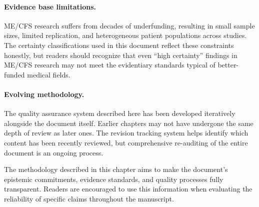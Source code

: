\paragraph{Evidence base limitations.}
ME/CFS research suffers from decades of underfunding, resulting in small sample sizes, limited replication, and heterogeneous patient populations across studies. The certainty classifications used in this document reflect these constraints honestly, but readers should recognize that even ``high certainty'' findings in ME/CFS research may not meet the evidentiary standards typical of better-funded medical fields.

\paragraph{Evolving methodology.}
The quality assurance system described here has been developed iteratively alongside the document itself. Earlier chapters may not have undergone the same depth of review as later ones. The revision tracking system helps identify which content has been recently reviewed, but comprehensive re-auditing of the entire document is an ongoing process.

\vspace{1em}
\noindent The methodology described in this chapter aims to make the document's epistemic commitments, evidence standards, and quality processes fully transparent. Readers are encouraged to use this information when evaluating the reliability of specific claims throughout the manuscript.
